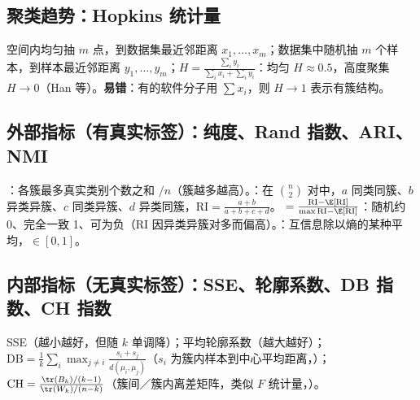 \subsection{聚类趋势：Hopkins 统计量}
空间内均匀抽 $m$ 点，到数据集最近邻距离 $x_1,\dots,x_m$；数据集中随机抽 $m$ 个样本，到样本最近邻距离 $y_1,\dots,y_m$；$H=\frac{\sum_iy_i}{\sum_ix_i+\sum_iy_i}$：均匀 $H\approx0.5$，高度聚集 $H\to0$（Han 等）。\textbf{易错}：有的软件分子用 $\sum x_i$，则 $H\to1$ 表示有簇结构。

\subsection{外部指标（有真实标签）：纯度、Rand 指数、ARI、NMI}
：各簇最多真实类别个数之和 $/n$（簇越多越高）。：在 $\binom n2$ 对中，$a$ 同类同簇、$b$ 异类异簇、$c$ 同类异簇、$d$ 异类同簇，$\mathrm{RI}=\frac{a+b}{a+b+c+d}$。 $=\frac{\mathrm{RI}-\E[\mathrm{RI}]}{\max\mathrm{RI}-\E[\mathrm{RI}]}$：随机约 0、完全一致 1、可为负（RI 因异类异簇对多而偏高）。：互信息除以熵的某种平均，$\in[0,1]$。

\subsection{内部指标（无真实标签）：SSE、轮廓系数、DB 指数、CH 指数}
SSE（越小越好，但随 $k$ 单调降）；平均轮廓系数（越大越好）；$\mathrm{DB}=\frac1k\sum_i\max_{j\neq i}\frac{s_i+s_j}{d(\mu_i,\mu_j)}$（$s_i$ 为簇内样本到中心平均距离，）；$\mathrm{CH}=\frac{\tr(B_k)/(k-1)}{\tr(W_k)/(n-k)}$（簇间／簇内离差矩阵，类似 $F$ 统计量，）。

